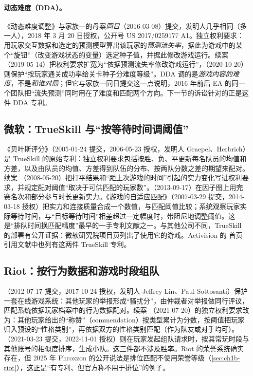\paragraph{动态难度（DDA）。}
《动态难度调整》与家族一的母案\emph{同日}（2016-03-08）提交，发明人几乎相同（多一人），2018 年 3 月 20 日授权，公开号 US 2017/0259177 A1\cite{aghdaie2018dynamic}\tagPat。独立权利要求：用玩家交互数据和选定的预测模型算出该玩家的\emph{预测流失率}，据此为游戏中的某个“旋钮”（改变游戏状态的变量）选定种子值，并据此修改游戏运行\tagPat。续案 （2019-05-14）把权利要求扩宽为“依据预测流失率修改游戏运行”，（2020-10-20）则保护“按玩家通关成功率给关卡种子分难度等级”\cite{aghdaie2019dynamic,aghdaie2020dynamic}\tagPat。DDA 调的是\emph{游戏内容的难度}，不是\emph{和谁对局}；但它与家族一同日提交这一点说明，2016 年前后 EA 的同一个团队把“流失预测”同时用在了难度和匹配两个方向。下一节的诉讼针对的正是这件 DDA 专利。

\subsection{微软：TrueSkill 与“按等待时间调阈值”}

《贝叶斯评分》（2005-01-24 提交，2006-05-23 授权，发明人 Graepel、Herbrich）是 TrueSkill 的原始专利\cite{graepel2006bayesian}\tagPat：独立权利要求包括按胜、负、平更新每名队员的均值和方差，以及由队员的均值、方差得到队伍的分布、按两队分数之差的期望来配对\tagPat。续案 （2008-05-20）把打平结果和“距上次游戏的时间”引起的实力变化写进权利要求，并规定配对阈值“取决于可供匹配的玩家数”\cite{graepel2008bayesian}\tagPat。（2013-09-17）在因子图上用完赛名次和部分参与时长更新实力\cite{minka2013determining}\tagPat。《游戏的自适应匹配》（2007-03-29 提交，2014-03-18 授权）把实力和连接质量合成一个数值，与匹配阈值比较；系统观察玩家实际等待时间，与“目标等待时间”相差超过一定幅度时，带阻尼地调整阈值\cite{graepel2014adaptive}\tagPat。这是“排队时间换匹配精度”最早的一手专利文献之一。与其他公司不同，TrueSkill 的部署有公开证据：微软研究院项目页列出了使用它的游戏\cite{microsoft2005trueskill}\tagOff。Activision 的  首页引用文献中也列有这两件 TrueSkill 专利\tagPat。

\subsection{Riot：按行为数据和游戏时段组队}

（2012-07-17 提交，2017-10-24 授权，发明人 Jeffrey Lin、Paul Sottosanti）保护一套在线游戏系统：其他玩家的举报形成“骚扰分”，由仲裁者对举报做同行评议，匹配系统依据玩家档案中的行为数据配对\cite{lin2017systems}\tagPat。续案 （2021-07-20）的独立权利要求改为：其他玩家给出的“称赞”（commendation）按类型累计为分数，按阈值把玩家归入预设的“性格类别”，再依据双方的性格类别匹配（作为队友或对手均可）\cite{lin2021systems}\tagPat。（2021-03-23 提交，2022-11-01 授权）则在玩家发起组队请求时，按其常玩时段与其他账号的相似度排序，生成小队\cite{tripathi2022activity}\tagPat。这三件都不涉及胜率。Riot 的荣誉系统确实存在，但 2025 年 Phroxzon 的公开说法是排位匹配不使用荣誉等级（\cref{sec:ch1b-riot}），这正是“有专利、但官方称不用于排位”的例子。


